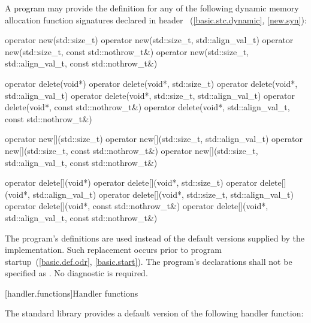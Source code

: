 \pnum
A \Cpp{} program may provide the definition for any of the following
dynamic memory allocation function signatures declared in header
~(\ref{basic.stc.dynamic}, \ref{new.syn}):

%
%
\begin{codeblock}
operator new(std::size_t)
operator new(std::size_t, std::align_val_t)
operator new(std::size_t, const std::nothrow_t&)
operator new(std::size_t, std::align_val_t, const std::nothrow_t&)
\end{codeblock}%
%
%
\begin{codeblock}
operator delete(void*)
operator delete(void*, std::size_t)
operator delete(void*, std::align_val_t)
operator delete(void*, std::size_t, std::align_val_t)
operator delete(void*, const std::nothrow_t&)
operator delete(void*, std::align_val_t, const std::nothrow_t&)
\end{codeblock}%
%
%
\begin{codeblock}
operator new[](std::size_t)
operator new[](std::size_t, std::align_val_t)
operator new[](std::size_t, const std::nothrow_t&)
operator new[](std::size_t, std::align_val_t, const std::nothrow_t&)
\end{codeblock}%
%
%
\begin{codeblock}
operator delete[](void*)
operator delete[](void*, std::size_t)
operator delete[](void*, std::align_val_t)
operator delete[](void*, std::size_t, std::align_val_t)
operator delete[](void*, const std::nothrow_t&)
operator delete[](void*, std::align_val_t, const std::nothrow_t&)
\end{codeblock}

\pnum
The program's definitions are used instead of the default versions supplied by
the implementation.
Such replacement occurs prior to program startup~(\ref{basic.def.odr}, \ref{basic.start}).
%
The program's declarations shall not be specified as
.
No diagnostic is required.

[handler.functions]{Handler functions}

\pnum
The \Cpp{} standard library provides a default version of the following handler
function:

